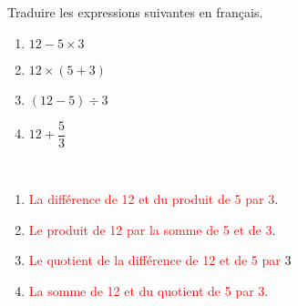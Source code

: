 \begin{exercice}%
    Traduire les expressions suivantes en français.
    \begin{multicols}{2}
      \begin{enumerate}
         \item $12-5\times3$
         \item $12\times(5+3)$
         \item $(12-5)\div3$
         \item $12+\dfrac{5}{3}$
      \end{enumerate}
   \end{multicols}
 \end{exercice}
 
 \begin{corrige}
    \ \\ [-5mm]
    \begin{enumerate}
       \item \textcolor{red}{La différence de 12 et du produit de 5 par 3}.
       \item \textcolor{red}{Le produit de 12 par la somme de 5 et de 3}.
       \item \textcolor{red}{Le quotient de la différence de 12 et de 5 par }3
       \item \textcolor{red}{La somme de 12 et du quotient de 5 par 3}.
    \end{enumerate}
 \end{corrige}